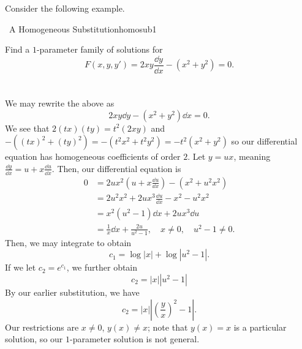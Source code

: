         Consider the following example.
        \begin{example}{\Difficulty\,\Difficulty\,\,A Homogeneous Substitution}{homosub1}
            
            Find a \(1\)-parameter family of solutions for 
            \begin{equation*}
                F(x,y,y')=2xy\frac{\dd y}{\dd x}-(x^2+y^2)=0.
            \end{equation*}
            \\
            \\
            We may rewrite the above as
            \begin{equation*}
                2xy\dd y-(x^2+y^2)\dd x=0.
            \end{equation*}
            We see that \(2(tx)(ty)=t^2(2xy)\) and \(-((tx)^2+(ty)^2)=-(t^2x^2+t^2y^2)=-t^2(x^2+y^2)\) so our differential equation has homogeneous coefficients of order \(2\). Let \(y=ux\), meaning \(\frac{\dd y}{\dd x}=u+x\frac{\dd u}{\dd x}\). Then, our differential equation is
            \begin{align*}
                0&=2ux^2\left(u+x\frac{\dd u}{\dd x}\right)-(x^2+u^2x^2) \\
                &=2u^2x^2+2ux^3\frac{\dd u}{\dd x}-x^2-u^2x^2 \\
                &=x^2(u^2-1)\dd x+2ux^3\dd u \\
                &=\frac{1}{x}\dd x+\frac{2u}{u^2-1},\quad x\neq0,\quad u^2-1\neq0.
            \end{align*}
            Then, we may integrate to obtain
            \begin{equation*}
                c_1=\log|x|+\log|u^2-1|.
            \end{equation*}
            If we let \(c_2=e^{c_1}\), we further obtain
            \begin{equation*}
                c_2=|x||u^2-1|
            \end{equation*}
            By our earlier substitution, we have 
            \begin{equation*}
                c_2=|x|\left|\left(\frac{y}{x}\right)^2-1\right|.
            \end{equation*}
            Our restrictions are \(x\neq0\), \(y(x)\neq x\); note that \(y(x)=x\) is a particular solution, so our \(1\)-parameter solution is not general.

        \end{example}

